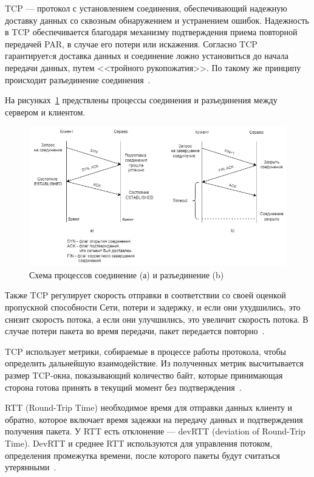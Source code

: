 TCP --- протокол с установлением соединения, обеспечивающий надежную доставку данных со сквозным обнаружением и устранением ошибок.
Надежность в TCP обеспечивается благодаря механизму подтверждения приема повторной передачей PAR, в случае его потери или искажения. Согласно TCP гарантируетcя доставка данных и соединение ложно установиться до начала передачи данных, путем <<тройного рукопожатия>>. По такому же принципу происходит разъединение соединения~\cite{tcp_ip_reilly, tcp_ip_lora}. 

\clearpage

На рисунках~\ref{pr:conn_network} предствлены процессы соединения и разъединения между сервером и клиентом.

\begin{figure}[h]
	\centering
	\includegraphics[width=1\textwidth]{img/tcp_network.png}
	\caption{Схема процессов соединение (а) и разъединение (b)~\cite{tcp_ip_reilly}}
	\label{pr:conn_network}
\end{figure}

Также TCP регулирует скорость отправки в соответствии со своей оценкой пропускной способности Сети, потери и задержку, и если они ухудшились, это снизит скорость потока, а если они улучшились, это увеличит скорость потока. 
В случае потери пакета во время передачи, пакет передается  повторно~\cite{tcp_ip_reilly, tcp_ip_lora, protocls_lakin}. 

TCP использует метрики, собираемые в процессе работы протокола, чтобы определить дальнейшую взаимодействие. Из полученных метрик высчитывается размер TCP-окна, показывающий количество байт, которые принимающая сторона готова принять в текущий момент без подтверждения~\cite{tcp_ip_reilly}.

RTT (Round-Trip Time) необходимое время для отправки данных клиенту и обратно, которое включает время задежки на передачу данных и подтверждения получения пакета. У RTT есть отклонение --- devRTT (deviation of Round-Trip Time).
DevRTT и среднее RTT используются для управления потоком, определения промежутка времени, после которого пакеты будут считаться утерянными~\cite{rfc_tcp}.

